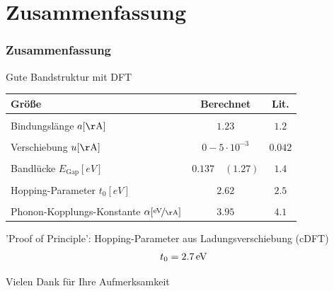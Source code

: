 \section{Zusammenfassung}
\begin{frame}
\frametitle{Zusammenfassung}
Gute Bandstruktur mit DFT
\begin{table}[!h]
	\centering
	\begin{tabular}{l|c|c}
		Größe & Berechnet & Lit.\\
		\hline \hline
		&&\\[-.3cm]
		Bindungslänge \hfill$a [\unit{\AA}]$ & $1.23$ & $1.2$\\ \hline&&\\[-.3cm]
		Verschiebung \hfill$u [\unit{\AA}]$& $0 - 5\cdot10^{-3}$ & $0.042$\\ \hline&&\\[-.3cm]
		Bandlücke \hfill$E_\text{Gap} [\unit{eV}]$ & $0.137\quad(1.27)$ & $1.4$\\ \hline &&\\[-.3cm]
		Hopping-Parameter \hfill$t_0 [\unit{eV}]$ & $2.62$ & $2.5$ \\ \hline&&\\[-.3cm]
		Phonon-Kopplungs-Konstante \hspace*{.5cm}$\alpha [\unitfrac{eV}{\AA}]$& $3.95$ & $4.1$
	\end{tabular}
\end{table}
'Proof of Principle': Hopping-Parameter aus Ladungsverschiebung (cDFT)\\
\begin{align*}
t_0 = \unit[2.7]{eV}
\end{align*}
\end{frame}

\begin{frame}
\centering
\begin{huge}
Vielen Dank für Ihre Aufmerksamkeit
\end{huge}

\end{frame}